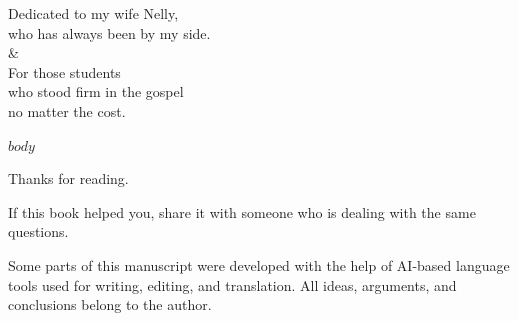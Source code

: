 \documentclass[12pt,oneside]{book}
\begin{document}
\begin{center}

Dedicated to my wife Nelly,\\
who has always been by my side.\\

\&\\

For those students \\
who stood firm in the gospel\\
no matter the cost.
\end{center}

\clearpage

\renewcommand{\contentsname}{Content}
\tableofcontents

\clearpage

$body$

\clearpage
\thispagestyle{empty}

\vspace*{4cm}

\begin{center}

Thanks for reading.

\vspace{1cm}

If this book helped you, 
share it with someone who is dealing with the same questions.\\

\vspace{1cm}

{\footnotesize
Some parts of this manuscript were developed 
with the help of AI-based language tools used 
for writing, editing, and translation. 
All ideas, arguments, and conclusions belong to the author.
}

\end{center}
\end{document}
